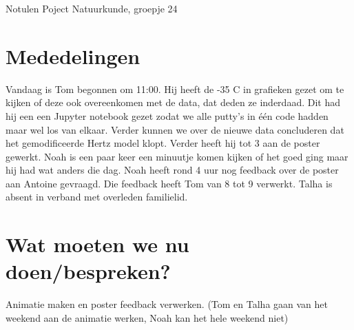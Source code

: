 \documentclass[11pt,a4paper]{article}
\begin{document}
\begin{Minutes}{Notulen Poject Natuurkunde, groepje 24}


\endtime{}
\location{}




\maketitle



\newpage


\section{Mededelingen} 
Vandaag is Tom begonnen om 11:00. Hij heeft de -35 C in grafieken gezet om te kijken of deze ook overeenkomen met de data, dat deden ze inderdaad. Dit had hij een een Jupyter notebook gezet zodat we alle putty's in één code hadden maar wel los van elkaar. Verder kunnen we over de nieuwe data concluderen dat het gemodificeerde Hertz model klopt. Verder heeft hij tot 3 aan de poster gewerkt. Noah is een paar keer een minuutje komen kijken of het goed ging maar hij had wat anders die dag. Noah heeft rond 4 uur nog feedback over de poster aan Antoine gevraagd. Die feedback heeft Tom van 8 tot 9 verwerkt. Talha is absent in verband met overleden familielid.


\section{Wat moeten we nu doen/bespreken?}
Animatie maken en poster feedback verwerken.
(Tom en Talha gaan van het weekend aan de animatie werken, Noah kan het hele weekend niet)



\end{Minutes}
\end{document}
